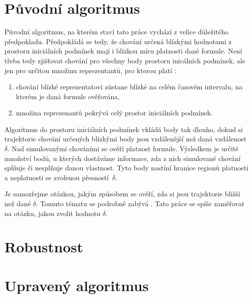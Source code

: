 \section{Původní algoritmus}

Původní algoritmus, na kterém staví tato práce vychází z velice důležitého předpokladu.
 Předpokládá se tedy, že chování určená blízkými
hodnotami z prostoru iniciálních podmínek mají i blízkou míru platnosti dané formule.
Není třeba tedy zjišťovat chování pro všechny body prostoru inicálních podmínek,
ale jen pro určitou množinu reprezentantů, pro kterou platí \cite[str. 25]{drazan2011}:

\begin{enumerate}
	\item	chování blízké reprezentatovi zůstane blízké na celém časovém intervalu,
			na kterém je daná formule ověřována,
	\item	množina reprezenantů pokrývá celý prostor iniciálních podmínek.
\end{enumerate}

Algoritmus do prostoru iniciálních podmínek vkládá body tak dlouho, dokud si trajektorie chování
určených blízkými body jsou vzdálenější než daná vzdálenost $\delta$. Nad simulovanými chováními
se ověří platnost formule. Výsledkem je určité množství bodů, u kterých dostáváme informace,
zda z nich simulované chování splňuje či nesplňuje danou vlastnost. Tyto body nastíní
hranice regionů platnosti a neplatnosti se zvolenou přes\-nos\-tí~$\delta$.

%

Je samozřejme otázkou, jakým způsobem se ověří, zda si jsou trajektorie bližší než
dané $\delta$. Tomuto tématu se podrobně zabývá \cite{drazan2011}. Tato
práce se spíše zaměřovat na otázku, jakou zvolit hodnotu $\delta$.

\section{Robustnost}\label{section:robustness}
\section{Upravený algoritmus}
